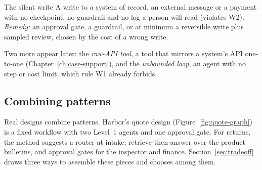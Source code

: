 \begin{antipattern}{The silent write}
A write to a system of record, an external message or a payment with no checkpoint, no guardrail and no log a person will read (violates W2). \emph{Remedy:} an approval gate, a guardrail, or at minimum a reversible write plus sampled review, chosen by the cost of a wrong write.
\end{antipattern}

Two more appear later: the \emph{raw-API tool}, a tool that mirrors a system's API one-to-one (Chapter~\ref{ch:case-support}), and the \emph{unbounded loop}, an agent with no step or cost limit, which rule W1 already forbids.

\subsection{Combining patterns}

Real designs combine patterns. Harbor's quote design (Figure~\ref{fig:quote-graph}) is a fixed workflow with two Level~1 agents and one approval gate. For returns, the method suggests a router at intake, retrieve-then-answer over the product bulletins, and approval gates for the inspector and finance. Section~\ref{sec:tradeoff} draws three ways to assemble these pieces and chooses among them.
